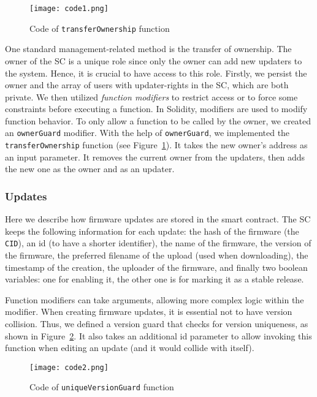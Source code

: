 \documentclass[conference]{IEEEtran}
\begin{document}
\begin{figure}[h]
\centering
\texttt{[image: code1.png]}
\caption{Code of \texttt{transferOwnership} function}
\label{fig:code1}
\vspace{-3mm}
\end{figure}

One standard management-related method is the transfer of ownership. The owner of the SC is a unique role since only the owner can add new updaters to the system. Hence, it is crucial to have access to this role. Firstly, we persist the owner and the array of users with updater-rights in the SC, which are both private. We then utilized \emph{function modifiers} to restrict access or to force some constraints before executing a function. In Solidity, modifiers are used to modify function behavior. To only allow a function to be called by the owner, we created an \texttt{ownerGuard} modifier. With the help of \texttt{ownerGuard}, we implemented the \texttt{transferOwnership} function (see Figure~\ref{fig:code1}). It takes the new owner's address as an input parameter. It removes the current owner from the updaters, then adds the new one as the owner and as an updater.

\subsubsection{Updates}

Here we describe how firmware updates are stored in the smart contract. The SC keeps the following information for each update: the hash of the firmware (the \texttt{CID}), an id (to have a shorter identifier), the name of the firmware, the version of the firmware, the preferred filename of the upload (used when downloading), the timestamp of the creation, the uploader of the firmware, and finally two boolean variables: one for enabling it, the other one is for marking it as a stable release. %

Function modifiers can take arguments, allowing more complex logic within the modifier. When creating firmware updates, it is essential not to have version collision. Thus, we defined a version guard that checks for version uniqueness, as shown in Figure~\ref{fig:code2}. It also takes an additional id parameter to allow invoking this function when editing an update (and it would collide with itself).

\begin{figure}[h]
\centering
\texttt{[image: code2.png]}
\caption{Code of \texttt{uniqueVersionGuard} function}
\label{fig:code2}
\vspace{-3mm}
\end{figure}
\end{document}
